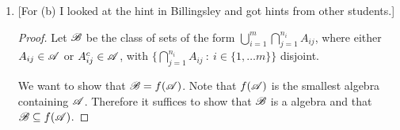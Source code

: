\begin{enumerate}
\begin{enumerate}[label=(\alph*)]
\begin{proof}
\begin{enumerate}
      \item If $X \in f(\ms A)$ then $X^c \in f(\ms A)$\\
        {\bf Proof:} If $X \in f(\ms A)$ then $X \in \ms F_n$ for all $n$, therefore $X^c \in \ms F_n$ for all $n$, therefore $X^c \in \bigcap_{n}\ms F_n = f(\ms A)$.

      \item If $X, Y \in f(\ms A)$ then $X \cup Y \in f(\ms A)$\\
        {\bf Proof:} If $X, Y \in f(\ms A)$ then $X, Y \in \ms F_n$ for all $n$, therefore $X \cup Y \in \ms F_n$ for all $n$, therefore $X \cup Y \in f(\ms A)$.
      \end{enumerate}
    \end{proof}

    \begin{claim*}
      $\ms A \subset f(\ms A)$
    \end{claim*}
    \begin{proof}
      Let $X \in \ms A$. Then $X \in \ms F_n$ for all $n$. Therefore $X \in \bigcap_{n}\ms F_n = f(\ms A)$. Therefore $\ms A \subset f(\ms A)$.
    \end{proof}

    \begin{claim*}
      $f(\ms A)$ is minimal in the sense that if $\ms G$ is an algebra and $\ms A \subset \ms G$, then $f(\ms A) \subset \ms G$.
    \end{claim*}
    \begin{proof}
      If $\ms G$ is an algebra with $\ms A \subset \ms G$ then $\ms G \in \{\ms F_1, \ms F_2, \ldots\}$, therefore $\ms G \supset \bigcap_{n}\ms F_n = f(\ms A)$.
    \end{proof}

  \item

    [For (b) I looked at the hint in Billingsley and got hints from other students.]

    \begin{proof}
      Let $\mathscr B$ be the class of sets of the form $\bigcup_{i=1}^m \bigcap_{j=1}^{n_i} A_{ij}$, where
      either $A_{ij} \in \mathscr A$ or $A^c_{ij} \in \mathscr A$,
      with $\big\{\bigcap_{j=1}^{n_i} A_{ij} ~ : ~ i \in \{1, \ldots m\}\big\}$ disjoint.

      We want to show that $\mathscr B = f(\mathscr A)$. Note that $f(\ms A)$ is the smallest algebra containing $\mathscr A$.
      Therefore it suffices to show that $\mathscr B$ is a algebra and that $\mathscr B \subseteq f(\mathscr A)$.


\end{proof}
\end{enumerate}
\end{enumerate}
